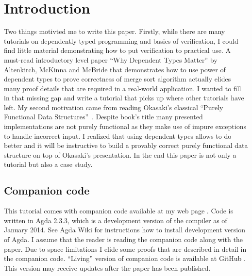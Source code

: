 \section{Introduction}


Two things motivted me to write this paper. Firstly, while there are many tutorials on dependently typed programming and basics of verification, I could find little material demonstrating how to put verification to practical use. A must-read introductory level paper ``Why Dependent Types Matter'' by Altenkirch, McKinna and McBride \cite{AltMcBMcK05} that demonstrates how to use power of dependent types to prove correctness of merge sort algorithm actually elides many proof details that are required in a real-world application. I wanted to fill in that missing gap and write a tutorial that picks up where other tutorials have left. My second motivation came from reading Okasaki's classical ``Purely Functional Data Structures''~\cite{Oka99}. Despite book's title many presented implementations are not purely functional as they make use of impure exceptions to handle incorrect input. I realized that using dependent types allows to do better and it will be instructive to build a provably correct purely functional data structure on top of Okasaki's presentation. In the end this paper is not only a tutorial but also a case study.


\subsection{Companion code}

This tutorial comes with companion code available at my web page \cite{js-webhome}. Code is written in Agda 2.3.3, which is a development version of the compiler as of January 2014. See Agda Wiki \cite{agda-wiki} for instructions how to install development version of Agda. I assume that the reader is reading the companion code along with the paper. Due to space limitations I elide some proofs that are described in detail in the companion code. ``Living'' version of companion code is available at GitHub \cite{js-github}. This version may receive updates after the paper has been published.

